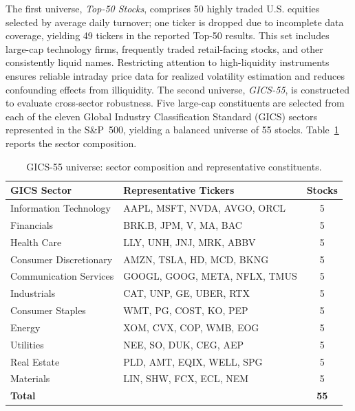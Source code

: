 \documentclass[review]{elsarticle}
\begin{document}
The first universe, \emph{Top-50 Stocks}, comprises 50 highly traded U.S. equities selected by average daily turnover; one ticker is dropped due to incomplete data coverage, yielding 49 tickers in the reported Top-50 results. %
This set includes large-cap technology firms, frequently traded retail-facing stocks, and other consistently liquid names. Restricting attention to high-liquidity instruments ensures reliable intraday price data for realized volatility estimation and reduces confounding effects from illiquidity. The second universe, \emph{GICS-55}, is constructed to evaluate cross-sector robustness. Five large-cap constituents are selected from each of the eleven Global Industry Classification Standard (GICS) sectors represented in the S\&P~500, yielding a balanced universe of 55 stocks. Table~\ref{tab:gics-composition} reports the sector composition.

\begin{table}[t]
\centering
\caption{GICS-55 universe: sector composition and representative constituents.}
\label{tab:gics-composition}
\begin{tabular}{llc}
\hline
GICS Sector & Representative Tickers & Stocks \\
\hline
Information Technology & AAPL, MSFT, NVDA, AVGO, ORCL & 5 \\
Financials & BRK.B, JPM, V, MA, BAC & 5 \\
Health Care & LLY, UNH, JNJ, MRK, ABBV & 5 \\
Consumer Discretionary & AMZN, TSLA, HD, MCD, BKNG & 5 \\
Communication Services & GOOGL, GOOG, META, NFLX, TMUS & 5 \\
Industrials & CAT, UNP, GE, UBER, RTX & 5 \\
Consumer Staples & WMT, PG, COST, KO, PEP & 5 \\
Energy & XOM, CVX, COP, WMB, EOG & 5 \\
Utilities & NEE, SO, DUK, CEG, AEP & 5 \\
Real Estate & PLD, AMT, EQIX, WELL, SPG & 5 \\
Materials & LIN, SHW, FCX, ECL, NEM & 5 \\
\hline
\multicolumn{2}{l}{\textbf{Total}} & \textbf{55} \\
\hline
\end{tabular}
\end{table}
\end{document}
